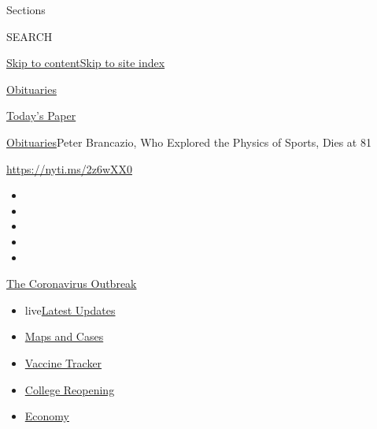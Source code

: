 Sections

SEARCH

\protect\hyperlink{site-content}{Skip to
content}\protect\hyperlink{site-index}{Skip to site index}

\href{https://www.nytimes.com/section/obituaries}{Obituaries}

\href{https://myaccount.nytimes.com/auth/login?response_type=cookie\&client_id=vi}{}

\href{https://www.nytimes.com/section/todayspaper}{Today's Paper}

\href{/section/obituaries}{Obituaries}\textbar{}Peter Brancazio, Who
Explored the Physics of Sports, Dies at 81

\url{https://nyti.ms/2z6wXX0}

\begin{itemize}
\item
\item
\item
\item
\item
\end{itemize}

\href{https://www.nytimes.com/news-event/coronavirus?action=click\&pgtype=Article\&state=default\&region=TOP_BANNER\&context=storylines_menu}{The
Coronavirus Outbreak}

\begin{itemize}
\tightlist
\item
  live\href{https://www.nytimes.com/2020/08/03/world/coronavirus-covid-19.html?action=click\&pgtype=Article\&state=default\&region=TOP_BANNER\&context=storylines_menu}{Latest
  Updates}
\item
  \href{https://www.nytimes.com/interactive/2020/us/coronavirus-us-cases.html?action=click\&pgtype=Article\&state=default\&region=TOP_BANNER\&context=storylines_menu}{Maps
  and Cases}
\item
  \href{https://www.nytimes.com/interactive/2020/science/coronavirus-vaccine-tracker.html?action=click\&pgtype=Article\&state=default\&region=TOP_BANNER\&context=storylines_menu}{Vaccine
  Tracker}
\item
  \href{https://www.nytimes.com/2020/08/02/us/covid-college-reopening.html?action=click\&pgtype=Article\&state=default\&region=TOP_BANNER\&context=storylines_menu}{College
  Reopening}
\item
  \href{https://www.nytimes.com/live/2020/08/03/business/stock-market-today-coronavirus?action=click\&pgtype=Article\&state=default\&region=TOP_BANNER\&context=storylines_menu}{Economy}
\end{itemize}

